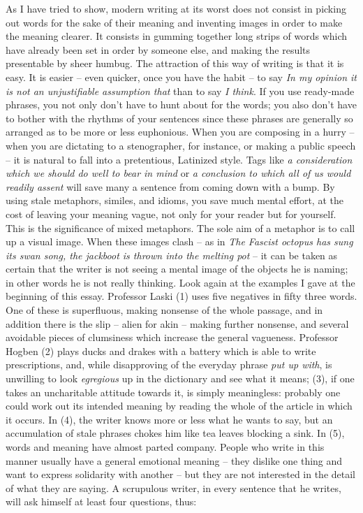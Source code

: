 \documentclass[article,twoside,a4paper]{memoir}
\begin{document}
As I have tried to show, modern writing at its worst does not consist in picking
out words for the sake of their meaning and inventing images in order to make
the meaning clearer. It consists in gumming together long strips of words which
have already been set in order by someone else, and making the results presentable
by sheer humbug. The attraction of this way of writing is that it is easy. It
is easier -- even quicker, once you have the habit -- to say \emph{In my opinion
  it is not an unjustifiable assumption that} than to say \emph{I think}. If
you use ready-made phrases, you not only don't have to hunt about for the words;
you also don't have to bother with the rhythms of your sentences since these
phrases are generally so arranged as to be more or less euphonious. When you
are composing in a hurry -- when you are dictating to a stenographer, for instance,
or making a public speech -- it is natural to fall into a pretentious, Latinized
style. Tags like \emph{a consideration which we should do well to bear in mind}
or \emph{a conclusion to which all of us would readily assent} will save many
a sentence from coming down with a bump. By using stale metaphors, similes,
and idioms, you save much mental effort, at the cost of leaving your meaning
vague, not only for your reader but for yourself. This is the significance of
mixed metaphors. The sole aim of a metaphor is to call up a visual image. When
these images clash -- as in \emph{The Fascist octopus has sung its swan song, the
  jackboot is thrown into the melting pot} -- it can be taken as certain that
the writer is not seeing a mental image of the objects he is naming; in other
words he is not really thinking. Look again at the examples I gave at the beginning
of this essay. Professor Laski (1) uses five negatives in fifty three words.
One of these is superfluous, making nonsense of the whole passage, and in addition
there is the slip -- alien for akin -- making further nonsense, and several
avoidable pieces of clumsiness which increase the general vagueness. Professor
Hogben (2) plays ducks and drakes with a battery which is able to write prescriptions,
and, while disapproving of the everyday phrase \emph{put up with}, is unwilling
to look \emph{egregious} up in the dictionary and see what it means; (3), if
one takes an uncharitable attitude towards it, is simply meaningless: probably
one could work out its intended meaning by reading the whole of the article
in which it occurs. In (4), the writer knows more or less what he wants to say,
but an accumulation of stale phrases chokes him like tea leaves blocking a sink.
In (5), words and meaning have almost parted company. People who write in this
manner usually have a general emotional meaning -- they dislike one thing and
want to express solidarity with another -- but they are not interested in the
detail of what they are saying. A scrupulous writer, in every sentence that
he writes, will ask himself at least four questions, thus:
\end{document}
